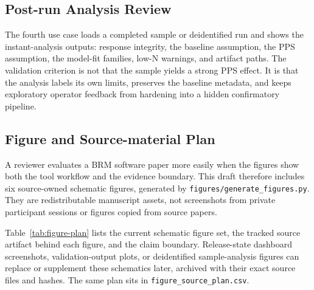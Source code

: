 \documentclass[pdflatex,sn-apa]{sn-jnl}
\newcommand{\code}[1]{\texttt{#1}}
\begin{document}
\subsection{Post-run Analysis Review}

The fourth use case loads a completed sample or deidentified run and shows the instant-analysis outputs: response integrity, the baseline assumption, the PPS assumption, the model-fit families, low-N warnings, and artifact paths. The validation criterion is not that the sample yields a strong PPS effect. It is that the analysis labels its own limits, preserves the baseline metadata, and keeps exploratory operator feedback from hardening into a hidden confirmatory pipeline.

\subsection{Figure and Source-material Plan}

A reviewer evaluates a BRM software paper more easily when the figures show both the tool workflow and the evidence boundary. This draft therefore includes six source-owned schematic figures, generated by \code{figures/generate\_figures.py}. They are redistributable manuscript assets, not screenshots from private participant sessions or figures copied from source papers.

Table~\ref{tab:figure-plan} lists the current schematic figure set, the tracked source artifact behind each figure, and the claim boundary. Release-state dashboard screenshots, validation-output plots, or deidentified sample-analysis figures can replace or supplement these schematics later, archived with their exact source files and hashes. The same plan sits in \code{figure\_source\_plan.csv}.
\end{document}

